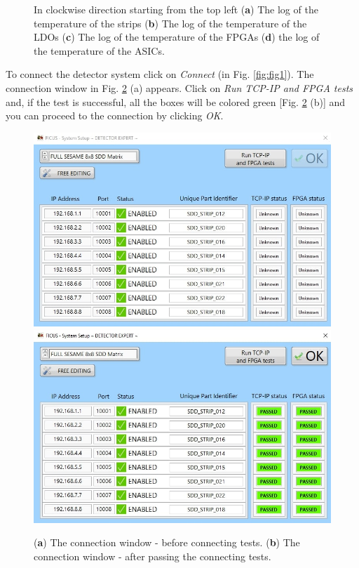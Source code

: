 \documentclass[a4paper,12pt,oneside,pdflatex,italian,final,twocolumn]{article}
\begin{document}
\begin{figure}[h]
\caption{In clockwise direction starting from the top left (\textbf{a}) The log of the temperature of the strips (\textbf{b}) The log of the temperature of the LDOs (\textbf{c}) The log of the temperature of the FPGAs (\textbf{d}) the log of the temperature of the ASICs.}\label{fig:fig4}
\end{figure}
\clearpage 

To connect the detector system click on \textit{Connect} (in Fig. \ref{fig:fig1}). The connection window in Fig. \ref{fig:fig5} (a) appears. 
Click on \textit{Run TCP-IP and FPGA tests} and, if the test is successful, all the boxes will be colored green [Fig. \ref{fig:fig5} (b)] and you can proceed to the connection by clicking \textit{OK}.

\begin{figure}[h]
\centering
\subfloat
{\includegraphics[scale=0.5]{Capture2.jpg}} \\
\subfloat
{\includegraphics[scale=0.5]{Capture3.jpg}} \\
\caption{(\textbf{a}) The connection window - before connecting tests. (\textbf{b}) The connection window - after passing the connecting tests.}\label{fig:fig5}
\end{figure}
\end{document}
